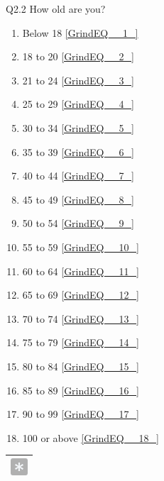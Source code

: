 \documentclass{article} %
\begin{document}
\noindent Q2.2 How old are you?

\begin{enumerate}
\item  Below 18  \eqref{GrindEQ__1_} 

\item  18 to 20  \eqref{GrindEQ__2_} 

\item  21 to 24  \eqref{GrindEQ__3_} 

\item  25 to 29  \eqref{GrindEQ__4_} 

\item  30 to 34  \eqref{GrindEQ__5_} 

\item  35 to 39  \eqref{GrindEQ__6_} 

\item  40 to 44  \eqref{GrindEQ__7_} 

\item  45 to 49  \eqref{GrindEQ__8_} 

\item  50 to 54  \eqref{GrindEQ__9_} 

\item  55 to 59  \eqref{GrindEQ__10_} 

\item  60 to 64  \eqref{GrindEQ__11_} 

\item  65 to 69  \eqref{GrindEQ__12_} 

\item  70 to 74  \eqref{GrindEQ__13_} 

\item  75 to 79  \eqref{GrindEQ__14_} 

\item  80 to 84  \eqref{GrindEQ__15_} 

\item  85 to 89  \eqref{GrindEQ__16_} 

\item  90 to 99  \eqref{GrindEQ__17_} 

\item  100 or above  \eqref{GrindEQ__18_} 
\end{enumerate}

\noindent 

\noindent 

\begin{tabular}{|p{0.2in}|} \hline 
\includegraphics*[width=0.25in, height=0.25in]{image2} \\ \hline 
\end{tabular}
\end{document}
